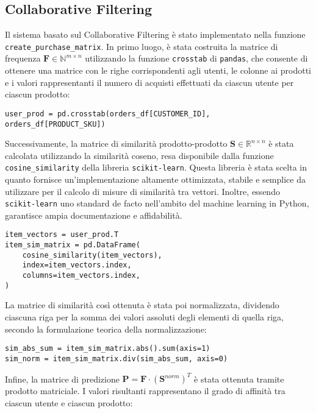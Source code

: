 \subsection{Collaborative Filtering}

Il sistema basato sul Collaborative Filtering è stato implementato nella funzione \texttt{create\_purchase\_matrix}. In primo luogo, è stata costruita la matrice di frequenza $\mathbf{F} \in \mathbb{N}^{m \times n}$ utilizzando la funzione \texttt{crosstab} di \texttt{pandas}, che consente di ottenere una matrice con le righe corrispondenti agli utenti, le colonne ai prodotti e i valori rappresentanti il numero di acquisti effettuati da ciascun utente per ciascun prodotto:

\begin{verbatim}
user_prod = pd.crosstab(orders_df[CUSTOMER_ID], orders_df[PRODUCT_SKU])
\end{verbatim}

Successivamente, la matrice di similarità prodotto-prodotto $\mathbf{S} \in \mathbb{R}^{n \times n}$ è stata calcolata utilizzando la similarità coseno, resa disponibile dalla funzione \texttt{cosine\_similarity} della libreria \texttt{scikit-learn}. Questa libreria è stata scelta in quanto fornisce un'implementazione altamente ottimizzata, stabile e semplice da utilizzare per il calcolo di misure di similarità tra vettori. Inoltre, essendo \texttt{scikit-learn} uno standard de facto nell'ambito del machine learning in Python, garantisce ampia documentazione e affidabilità.

\begin{verbatim}
item_vectors = user_prod.T
item_sim_matrix = pd.DataFrame(
    cosine_similarity(item_vectors),
    index=item_vectors.index,
    columns=item_vectors.index,
)
\end{verbatim}

La matrice di similarità così ottenuta è stata poi normalizzata, dividendo ciascuna riga per la somma dei valori assoluti degli elementi di quella riga, secondo la formulazione teorica della normalizzazione:

\begin{verbatim}
sim_abs_sum = item_sim_matrix.abs().sum(axis=1)
sim_norm = item_sim_matrix.div(sim_abs_sum, axis=0)
\end{verbatim}

Infine, la matrice di predizione $\mathbf{P} = \mathbf{F} \cdot (\mathbf{S}^{norm})^T$ è stata ottenuta tramite prodotto matriciale. I valori risultanti rappresentano il grado di affinità tra ciascun utente e ciascun prodotto:

